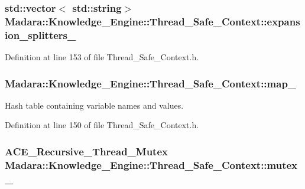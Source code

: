 \hypertarget{classMadara_1_1Knowledge__Engine_1_1Thread__Safe__Context_ac98bb47361f4d859e8306de5d92ca0eb}{
\subsubsection[{expansion\_\-splitters\_\-}]{\setlength{\rightskip}{0pt plus 5cm}std::vector$<$ std::string$>$ {\bf Madara::Knowledge\_\-Engine::Thread\_\-Safe\_\-Context::expansion\_\-splitters\_\-}}}
\label{d4/da3/classMadara_1_1Knowledge__Engine_1_1Thread__Safe__Context_ac98bb47361f4d859e8306de5d92ca0eb}


Definition at line 153 of file Thread\_\-Safe\_\-Context.h.

\hypertarget{classMadara_1_1Knowledge__Engine_1_1Thread__Safe__Context_ab440ae2c260b9592a3bc899c3f9a2607}{
\subsubsection[{map\_\-}]{ {\bf Madara::Knowledge\_\-Engine::Thread\_\-Safe\_\-Context::map\_\-}}}
\label{d4/da3/classMadara_1_1Knowledge__Engine_1_1Thread__Safe__Context_ab440ae2c260b9592a3bc899c3f9a2607}


Hash table containing variable names and values. 



Definition at line 150 of file Thread\_\-Safe\_\-Context.h.

\hypertarget{classMadara_1_1Knowledge__Engine_1_1Thread__Safe__Context_a239fefcb443bba3eddef39342ca6a110}{
\subsubsection[{mutex\_\-}]{\setlength{\rightskip}{0pt plus 5cm}ACE\_\-Recursive\_\-Thread\_\-Mutex {\bf Madara::Knowledge\_\-Engine::Thread\_\-Safe\_\-Context::mutex\_\-}}}
\label{d4/da3/classMadara_1_1Knowledge__Engine_1_1Thread__Safe__Context_a239fefcb443bba3eddef39342ca6a110}


